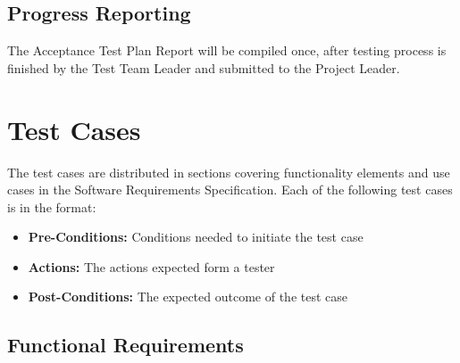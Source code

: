 \documentclass[titlepage]{article}
\begin{document}

\subsection{Progress Reporting}
    The Acceptance Test Plan Report will be compiled once, after testing process is finished by the Test Team Leader and submitted to the Project Leader.


\section{Test Cases%
    \label{cases}%
}

    The test cases are distributed in sections covering functionality elements and use cases in the Software Requirements Specification. Each of the following test cases is in the format:
    \begin{itemize}
        \item \textbf{Pre-Conditions:} Conditions needed to initiate the test case
        \item \textbf{Actions:} The actions expected form a tester
        \item \textbf{Post-Conditions:} The expected outcome of the test case
    \end{itemize}


\subsection{Functional Requirements%
    \label{functional}%
}
\end{document}
